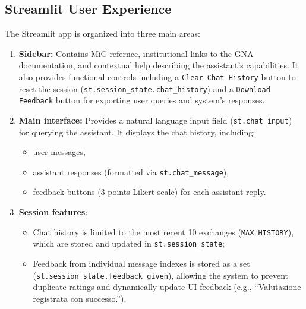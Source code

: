 \begin{spacing}{1.5}
\subsection{Streamlit User Experience}
The Streamlit app is organized into three main areas:
\begin{enumerate}
      \item \textbf{Sidebar:} Contains MiC refernce, institutional links to the GNA documentation, and contextual help describing the assistant’s capabilities. It also provides functional controls including a \texttt{Clear Chat History} button to reset the session (\texttt{st.session\_state.chat\_history}) and a \texttt{Download Feedback} button for exporting user queries and system's responses.
      \item \textbf{Main interface:} Provides a natural language input field (\texttt{st.chat\_input}) for querying the assistant. It displays the chat history, including:
      \begin{itemize}
        \item user messages,
        \item assistant responses (formatted via \texttt{st.chat\_message}),
        \item feedback buttons (3 points Likert-scale) for each assistant reply.
      \end{itemize}
      \item \textbf{Session features}: 
      \begin{itemize}
      \item Chat history is limited to the most recent 10 exchanges (\texttt{MAX\_HISTORY}), which are stored and updated in \texttt{st.session\_state};
      \item Feedback from individual message indexes is stored as a set (\texttt{st.session\_state.feedback\_given}), allowing the system to prevent duplicate ratings and dynamically update UI feedback (e.g., ``Valutazione registrata con successo.'').
      \end{itemize}
      
\end{enumerate}


\end{spacing}
